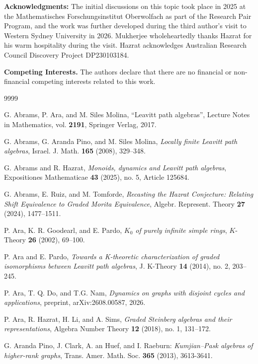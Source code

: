 \documentclass[a4paper,reqno,12pt]{amsart}
\numberwithin{equation}{section}
\theoremstyle{definition}
\theoremstyle{remark}
\begin{document}
\textbf{Acknowledgments:} The initial discussions on this topic took place in 2025 at the Mathematisches Forschungsinstitut Oberwolfach as part of the Research Pair Program, and the work was further developed during the third author’s visit to Western Sydney University in 2026. Mukherjee wholeheartedly thanks Hazrat for his warm hospitality during the visit. Hazrat acknowledges Australian Research Council Discovery Project DP230103184.

{\bf Competing Interests.} The authors declare that there are no financial or non-financial competing interests related to this work.

\begin{thebibliography}{9999}

G. Abrams, P. Ara, and M. Siles Molina, ``Leavitt path algebras'', Lecture Notes in Mathematics, vol. \textbf{2191}, Springer Verlag, 2017.

G. Abrams, G. Aranda Pino, and M. Siles Molina, \emph{Locally finite Leavitt path algebras}, Israel. J. Math. \textbf{165} (2008), 329--348. 

G. Abrams and R. Hazrat, \emph{Monoids, dynamics and Leavitt path algebras}, Expositiones Mathematicae {\bf 43} (2025), no. 5, Article 125684.

G. Abrams, E. Ruiz, and M. Tomforde, \emph{Recasting the Hazrat Conjecture: Relating Shift Equivalence to Graded Morita Equivalence}, Algebr. Represent. Theory {\bf 27} (2024), 1477--1511.

P. Ara, K. R. Goodearl, and E. Pardo, \emph{$K_0$ of purely infinite simple rings}, $K$-Theory \textbf{26} (2002), 69--100.

P. Ara and E. Pardo, \emph{Towards a K-theoretic characterization of graded isomorphisms
between Leavitt path algebras}, J. K-Theory {\bf 14} (2014), no. 2, 203--245.

P. Ara, T. Q. Do, and T.G. Nam, \emph{Dynamics on graphs with disjoint cycles and applications}, preprint, arXiv:2608.00587, 2026.

P. Ara, R. Hazrat, H. Li, and A. Sims, \emph{Graded Steinberg algebras and their representations}, Algebra Number Theory {\bf 12} (2018), no. 1, 131--172.

G. Aranda Pino, J. Clark, A. an Huef, and I. Raeburn: \emph{Kumjian--Pask algebras of higher-rank graphs}, Trans. Amer. Math. Soc. \textbf{365} (2013), 3613-3641.


\end{thebibliography}
\end{document}
